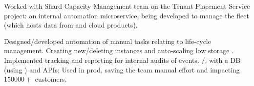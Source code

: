 \documentclass[a4paper]{resume}
\begin{document}
\begin{minipage}[t]{0.66\textwidth}
	\begin{tightitemize}
		\item {
		            Worked with Shard Capacity Management team on the Tenant Placement Service project: an internal \aws{}
		            automation microservice, being developed to manage the \rds{} fleet (which hosts data from \jira{} and
		            \conf{} cloud products).
		      }
		\item {
		            Designed/developed automation of manual tasks relating to \rds{} life-cycle management. Creating
		            new/deleting \rds{} instances and auto-scaling low storage \rds{}. Implemented tracking and
		            reporting for internal audits of \rds{} events. \kotlin{}/\spring{}, with a \postgres{} DB (using
		            \jpa{}) and \rest{} APIs; Used in prod, saving the team manual effort and impacting $\num{150000} +$
		            customers.
		      }
	\end{tightitemize}
	\smallsectionspace{}

\end{minipage}
\end{document}
